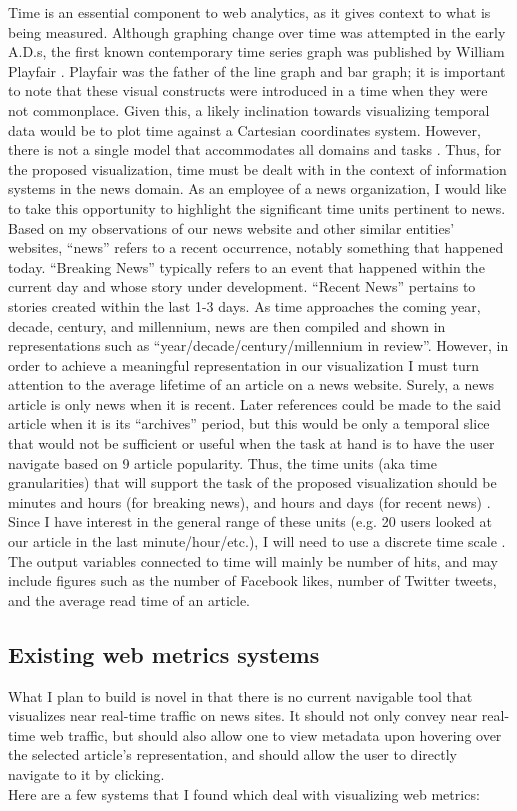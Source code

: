 \documentclass[12pt]{article}
\begin{document}
Time is an essential component to web analytics, as it gives context to what is being measured. Although graphing change over time was attempted in the early A.D.s, the first known contemporary time series graph was published by William Playfair \cite{playfair}. Playfair was the father of the line graph and bar graph; it is important to note that these visual constructs were introduced in a time when they were not commonplace. Given this, a likely inclination towards visualizing temporal data would be to plot time against a Cartesian coordinates system. However, there is not a single model that accommodates all domains and tasks \cite{frank}. Thus, for the proposed visualization, time must be dealt with in the context of information systems in the news domain. As an employee of a news organization, I would like to take this opportunity to highlight the significant time units pertinent to news. Based on my observations of our news website and other similar entities’ websites, “news” refers to a recent occurrence, notably something that happened today. “Breaking News” typically refers to an event that happened within the current day and whose story under development. “Recent News” pertains to stories created within the last 1-3 days. As time approaches the coming year, decade, century, and millennium, news are then compiled and shown in representations such as “year/decade/century/millennium in review”. However, in order to achieve a meaningful representation in our visualization I must turn attention to the average lifetime of an article on a news website. Surely, a news article is only news when it is recent. Later references could be made to the said article when it is its “archives” period, but this would be only a temporal slice that would not be sufficient or useful when the task at hand is to have the user navigate based on
9
article popularity. Thus, the time units (aka time granularities) that will support the task of the proposed visualization should be minutes and hours (for breaking news), and hours and days (for recent news) \cite{bettini}. Since I have interest in the general range of these units (e.g. 20 users looked at our article in the last minute/hour/etc.), I will need to use a discrete time scale \cite{goralwalla}. The output variables connected to time will mainly be number of hits, and may include figures such as the number of Facebook likes, number of Twitter tweets, and the average read time of an article.

\subsection{Existing web metrics systems}
What I plan to build is novel in that there is no current navigable tool that visualizes near real-time traffic on news sites. It should not only convey near real-time web traffic, but should also allow one to view metadata upon hovering over the selected article's representation, and should allow the user to directly navigate to it by clicking.\\
Here are a few systems that I found which deal with visualizing web metrics: \\
\end{document}
